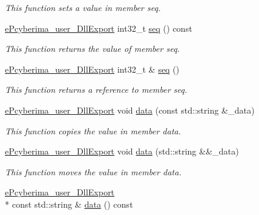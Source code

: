 \begin{DoxyCompactItemize}
\begin{DoxyCompactList}\small\item\em This function sets a value in member seq. \end{DoxyCompactList}\item 
\hyperlink{underlay__message_8h_a72796233f09f587d949ca1aa9842453d}{e\-Pcyberima\-\_\-user\-\_\-\-Dll\-Export} int32\-\_\-t \hyperlink{classapollo_1_1cyber_1_1transport_1_1UnderlayMessage_a7ab37f2fc5b21fb66bb0203e832b0810}{seq} () const 
\begin{DoxyCompactList}\small\item\em This function returns the value of member seq. \end{DoxyCompactList}\item 
\hyperlink{underlay__message_8h_a72796233f09f587d949ca1aa9842453d}{e\-Pcyberima\-\_\-user\-\_\-\-Dll\-Export} int32\-\_\-t \& \hyperlink{classapollo_1_1cyber_1_1transport_1_1UnderlayMessage_ae9fd4f6fc255f6a1c950c0d7a6c8ddc3}{seq} ()
\begin{DoxyCompactList}\small\item\em This function returns a reference to member seq. \end{DoxyCompactList}\item 
\hyperlink{underlay__message_8h_a72796233f09f587d949ca1aa9842453d}{e\-Pcyberima\-\_\-user\-\_\-\-Dll\-Export} void \hyperlink{classapollo_1_1cyber_1_1transport_1_1UnderlayMessage_a8c0257458aca2f88a7875719d638b6bd}{data} (const std\-::string \&\-\_\-data)
\begin{DoxyCompactList}\small\item\em This function copies the value in member data. \end{DoxyCompactList}\item 
\hyperlink{underlay__message_8h_a72796233f09f587d949ca1aa9842453d}{e\-Pcyberima\-\_\-user\-\_\-\-Dll\-Export} void \hyperlink{classapollo_1_1cyber_1_1transport_1_1UnderlayMessage_a7dc1aa437e068fd769c6c8b8dbf8e1ff}{data} (std\-::string \&\&\-\_\-data)
\begin{DoxyCompactList}\small\item\em This function moves the value in member data. \end{DoxyCompactList}\item 
\hyperlink{underlay__message_8h_a72796233f09f587d949ca1aa9842453d}{e\-Pcyberima\-\_\-user\-\_\-\-Dll\-Export} \\*
const std\-::string \& \hyperlink{classapollo_1_1cyber_1_1transport_1_1UnderlayMessage_a2488eeed95a5f5b8acc7a3c9fdb1223c}{data} () const 

\end{DoxyCompactItemize}
